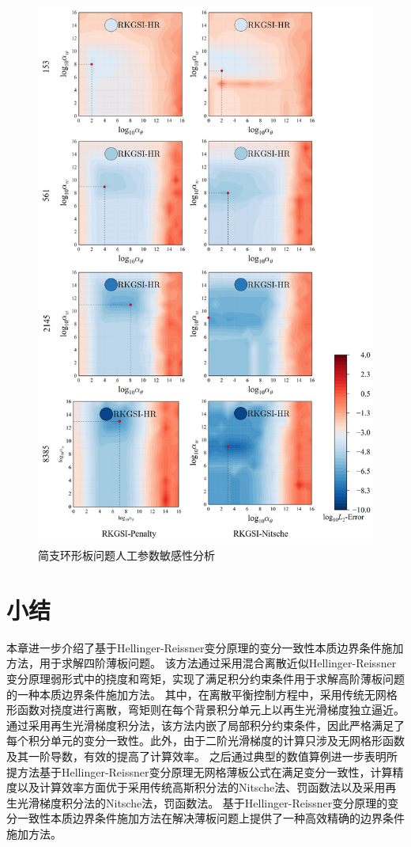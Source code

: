 \begin{figure}[H]
    \centering
    \includegraphics[scale=0.5]{figure/PHR/A/alpha.png}
    \caption{简支环形板问题人工参数敏感性分析}\label{Aalpha}
\end{figure}
\section{小结}
本章进一步介绍了基于Hellinger-Reissner变分原理的变分一致性本质边界条件施加方法，用于求解四阶薄板问题。
该方法通过采用混合离散近似Hellinger-Reissner变分原理弱形式中的挠度和弯矩，实现了满足积分约束条件用于求解高阶薄板问题的一种本质边界条件施加方法。
其中，在离散平衡控制方程中，采用传统无网格形函数对挠度进行离散，弯矩则在每个背景积分单元上以再生光滑梯度独立逼近。
通过采用再生光滑梯度积分法，该方法内嵌了局部积分约束条件，因此严格满足了每个积分单元的变分一致性。此外，由于二阶光滑梯度的计算只涉及无网格形函数及其一阶导数，有效的提高了计算效率。 
之后通过典型的数值算例进一步表明所提方法基于Hellinger-Reissner变分原理无网格薄板公式在满足变分一致性，计算精度以及计算效率方面优于采用传统高斯积分法的Nitsche法、罚函数法以及采用再生光滑梯度积分法的Nitsche法，罚函数法。
基于Hellinger-Reissner变分原理的变分一致性本质边界条件施加方法在解决薄板问题上提供了一种高效精确的边界条件施加方法。





